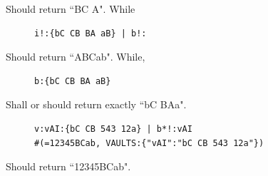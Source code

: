 \documentclass[a4paper, 18pt]{book} %
\begin{document}
Should return ``BC A". While  


 \begin{figure}[H]
 \Large
  \centering
  \begin{tcolorbox}[teaterminalstyle, title=TEA Program: computing LEXICAL Base of AI]
  \begin{lstlisting}[language=TEA]
i!:{bC CB BA aB} | b!:
   \end{lstlisting}
  \end{tcolorbox}
\end{figure}

Should return ``ABCab". While,  


 \begin{figure}[H]
 \Large
  \centering
  \begin{tcolorbox}[teaterminalstyle, title=TEA Program: compute FIFO Base of a literal string]
  \begin{lstlisting}[language=TEA]
b:{bC CB BA aB}
   \end{lstlisting}
  \end{tcolorbox}
\end{figure}


Shall or should return exactly ``bC BAa".

 \begin{figure}[H]
 \Large
  \centering
  \begin{tcolorbox}[teaterminalstyle, title=TEA Program: computing LEXICAL Base of data in a vault]
  \begin{lstlisting}[language=TEA]
v:vAI:{bC CB 543 12a} | b*!:vAI 
#(=12345BCab, VAULTS:{"vAI":"bC CB 543 12a"})
   \end{lstlisting}
  \end{tcolorbox}
\end{figure}

Should return ``12345BCab". 
\end{document}
